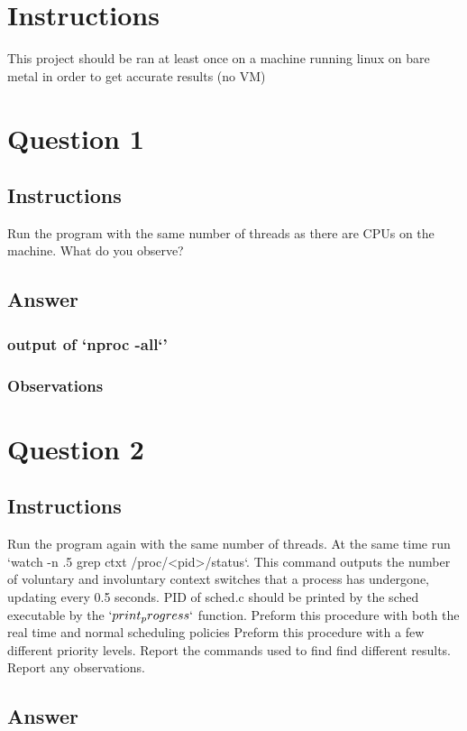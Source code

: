 \documentclass{assignment-x}
\begin{document}
\maketitle
\pagebreak

\section{Instructions}
This project should be ran at least once on a machine running linux on bare metal in order to get accurate results (no VM)

\section{Question 1}
\subsection{Instructions}
Run the program with the same number of threads as there are CPUs on the machine. What do you observe?
\subsection{Answer}
\subsubsection{output of `nproc -all`'}
\subsubsection{Observations}

\section {Question 2}
\subsection{Instructions}
Run the program again with the same number of threads. 
At the same time run `watch -n .5 grep ctxt /proc/<pid>/status`. This command outputs the number of voluntary and involuntary context switches that a process has undergone, updating every 0.5 seconds. 
PID of sched.c should be printed by the sched executable by the $`print_progress`$ function.
Preform this procedure with both the real time and normal scheduling policies
Preform this procedure with a few different priority levels.
Report the commands used to find find different results.
Report any observations.
\subsection{Answer}
\end{document}
